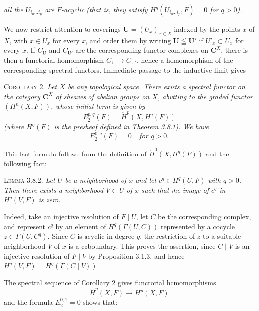 
\noindent\textit{all the $U_{i_0\ldots i_p}$ are $F$-acyclic \textup{(}that is, they
satisfy $H^q(U_{i_0\ldots i_p},F)=0$ for $q>0$\textup{)}.}

We now restrict attention to coverings
$\mathbf U=(U_x)_{x\in X}$ indexed by the points $x$ of $X$, with
$x\in U_x$ for every $x$, and order them by writing
$\mathbf U\leqq\mathbf U'$ if $U'_x\subset U_x$ for every $x$.
If $C_{\mathrm U}$ and $C_{\mathrm U'}$ are the corresponding
functor-complexes on $\mathbf C^X$, there is then a functorial homomorphism
$C_{\mathrm U}\to C_{\mathrm U'}$, hence a homomorphism of the
corresponding spectral functors. Immediate passage to the inductive limit gives

\textsc{Corollary 2.} \textit{Let $X$ be any topological space.
There exists a spectral functor on the category $\mathbf C^X$ of sheaves of abelian
groups on $X$, abutting to the graded functor $(H^n(X,F))$, whose initial term
is given by}
\[
E_2^{p,q}(F)=\check H^p(X,H^q(F))
\]
\textit{\textup{(}where $H^q(F)$ is the presheaf defined in Theorem \textup{3.8.1)}. We have}
\[
E_2^{0,q}(F)=0\quad\textit{for }q>0.
\]

This last formula follows from the definition of $\check H^0(X,H^q(F))$ and
the following fact:

\textsc{Lemma 3.8.2.} \textit{Let $U$ be a neighborhood of $x$
and let $c^q\in H^q(U,F)$ with $q>0$. Then there exists a neighborhood $V\subset U$ of
$x$ such that the image of $c^q$ in $H^q(V,F)$ is zero.}

Indeed, take an injective resolution of $F\mid U$, let $C$ be the corresponding
complex, and represent $c^q$ by an element of $H^q(\Gamma(U,C))$ represented
by a cocycle $z\in\Gamma(U,C^q)$. Since $C$ is acyclic in degree $q$, the
restriction of $z$ to a suitable neighborhood $V$ of $x$ is a coboundary.
This proves the assertion, since $C\mid V$ is an injective resolution of
$F\mid V$ by Proposition 3.1.3, and hence
$H^q(V,F)=H^q(\Gamma(C\mid V))$.

The spectral sequence of Corollary 2 gives functorial homomorphisms
\[
\check H^p(X,F)\to H^p(X,F)
\]
and the formula
$E_2^{0,1}=0$
shows that:

